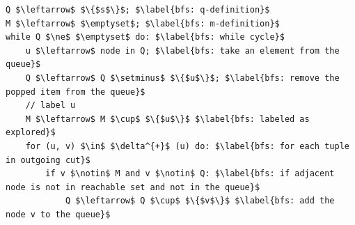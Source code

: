 \begin{lstlisting}[language=pseudo-code, caption={Graph reachability problem: Breadth-First Search $O\left(\left|N\right|+\left|A\right|\right)$}]
Q $\leftarrow$ $\{$s$\}$; $\label{bfs: q-definition}$
M $\leftarrow$ $\emptyset$; $\label{bfs: m-definition}$
while Q $\ne$ $\emptyset$ do: $\label{bfs: while cycle}$
    u $\leftarrow$ node in Q; $\label{bfs: take an element from the queue}$
    Q $\leftarrow$ Q $\setminus$ $\{$u$\}$; $\label{bfs: remove the popped item from the queue}$
    // label u
    M $\leftarrow$ M $\cup$ $\{$u$\}$ $\label{bfs: labeled as explored}$
    for (u, v) $\in$ $\delta^{+}$ (u) do: $\label{bfs: for each tuple in outgoing cut}$
        if v $\notin$ M and v $\notin$ Q: $\label{bfs: if adjacent node is not in reachable set and not in the queue}$
            Q $\leftarrow$ Q $\cup$ $\{$v$\}$ $\label{bfs: add the node v to the queue}$
\end{lstlisting}

